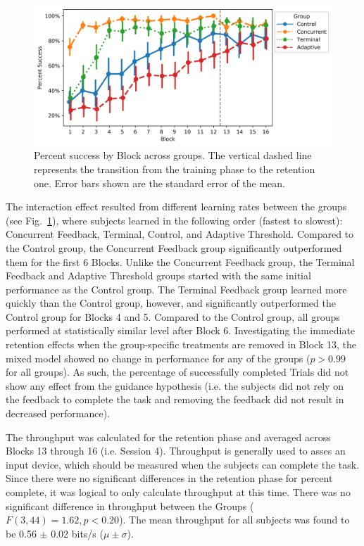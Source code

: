\begin{figure}[hbt!]
\centering
\includegraphics[height=.4\textwidth]{figures/PercentSuccess}
\caption{\label{figure:label3} Percent success by Block across groups.
The vertical dashed line represents the transition from the training phase to the retention one.
Error bars shown are the standard error of the mean.}
\end{figure}

The interaction effect resulted from different learning rates between the groups (see Fig.~\ref{figure:label3}), where subjects learned in the following order (fastest to slowest): Concurrent Feedback, Terminal, Control, and Adaptive Threshold.
Compared to the Control group, the Concurrent Feedback group significantly outperformed them for the first 6 Blocks.
Unlike the Concurrent Feedback group, the Terminal Feedback and Adaptive Threshold groups started with the same initial performance as the Control group.
The Terminal Feedback group learned more quickly than the Control group, however, and significantly outperformed the Control group for Blocks 4 and 5.
Compared to the Control group, all groups performed at statistically similar level after Block 6.
Investigating the immediate retention effects when the group-specific treatments are removed in Block 13, the mixed model showed no change in performance for any of the groups ($p > 0.99$ for all groups).
As such, the percentage of successfully completed Trials did not show any effect from the guidance hypothesis (i.e. the subjects did not rely on the feedback to complete the task and removing the feedback did not result in decreased performance).

The throughput was calculated for the retention phase and averaged across Blocks 13 through 16 (i.e. Session 4).
Throughput is generally used to asses an input device, which should be measured when the subjects can complete the task.
Since there were no significant differences in the retention phase for percent complete, it was logical to only calculate throughput at this time.
There was no significant difference in throughput between the Groups ($F(3, 44) = 1.62, p < 0.20$).
The mean throughput for all subjects was found to be 0.56 $\pm$ 0.02 bits/s ($\mu\pm\sigma$).

